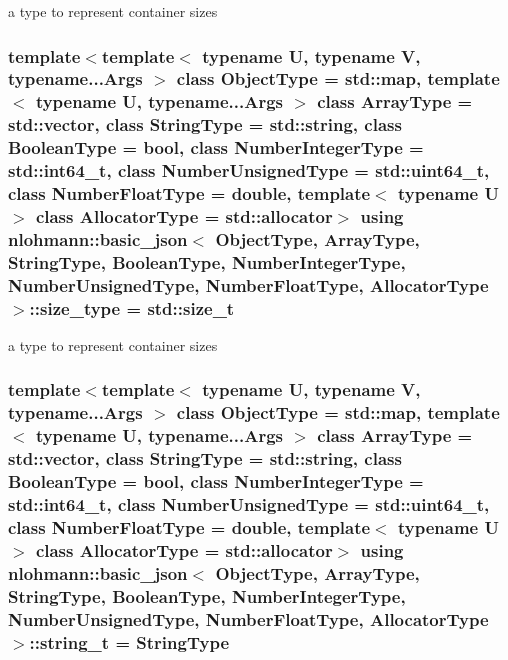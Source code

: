a type to represent container sizes 

\hypertarget{classnlohmann_1_1basic__json_a1579a8f72a230358d6cd1a6e8a62859b}{
\subsubsection[{size\-\_\-type}]{\setlength{\rightskip}{0pt plus 5cm}template$<$template$<$ typename U, typename V, typename...\-Args $>$ class Object\-Type = std\-::map, template$<$ typename U, typename...\-Args $>$ class Array\-Type = std\-::vector, class String\-Type  = std\-::string, class Boolean\-Type  = bool, class Number\-Integer\-Type  = std\-::int64\-\_\-t, class Number\-Unsigned\-Type  = std\-::uint64\-\_\-t, class Number\-Float\-Type  = double, template$<$ typename U $>$ class Allocator\-Type = std\-::allocator$>$ using {\bf nlohmann\-::basic\-\_\-json}$<$ Object\-Type, Array\-Type, String\-Type, Boolean\-Type, Number\-Integer\-Type, Number\-Unsigned\-Type, Number\-Float\-Type, Allocator\-Type $>$\-::{\bf size\-\_\-type} =  std\-::size\-\_\-t}}\label{classnlohmann_1_1basic__json_a1579a8f72a230358d6cd1a6e8a62859b}


a type to represent container sizes 

\hypertarget{classnlohmann_1_1basic__json_ab63e618bbb0371042b1bec17f5891f42}{
\subsubsection[{string\-\_\-t}]{\setlength{\rightskip}{0pt plus 5cm}template$<$template$<$ typename U, typename V, typename...\-Args $>$ class Object\-Type = std\-::map, template$<$ typename U, typename...\-Args $>$ class Array\-Type = std\-::vector, class String\-Type  = std\-::string, class Boolean\-Type  = bool, class Number\-Integer\-Type  = std\-::int64\-\_\-t, class Number\-Unsigned\-Type  = std\-::uint64\-\_\-t, class Number\-Float\-Type  = double, template$<$ typename U $>$ class Allocator\-Type = std\-::allocator$>$ using {\bf nlohmann\-::basic\-\_\-json}$<$ Object\-Type, Array\-Type, String\-Type, Boolean\-Type, Number\-Integer\-Type, Number\-Unsigned\-Type, Number\-Float\-Type, Allocator\-Type $>$\-::{\bf string\-\_\-t} =  String\-Type}}\label{classnlohmann_1_1basic__json_ab63e618bbb0371042b1bec17f5891f42}


